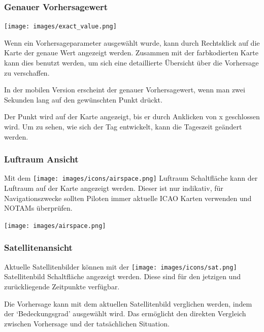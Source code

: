 \documentclass[11pt,a4paper]{article}
\begin{document}
\subsubsection{Genauer Vorhersagewert}
\begin{center}
\texttt{[image: images/exact\_value.png]}
\end{center}

Wenn ein Vorhersageparameter ausgewählt wurde, kann durch Rechtsklick auf die Karte der genaue Wert angezeigt werden. Zusammen mit der farbkodierten Karte kann dies benutzt werden, um sich eine detaillierte Übersicht über die Vorhersage zu verschaffen.

In der mobilen Version erscheint der genauer Vorhersagewert, wenn man zwei Sekunden lang auf den gewünschten Punkt drückt.

\begin{tip}
\item Der Punkt wird auf der Karte angezeigt, bis er durch Anklicken von x geschlossen wird. Um zu sehen, wie sich der Tag entwickelt, kann die Tageszeit geändert werden.
\end{tip}

\subsubsection{Luftraum Ansicht}
Mit dem \texttt{[image: images/icons/airspace.png]} Luftraum Schaltfläche kann der Luftraum auf der Karte angezeigt werden. Dieser ist nur indikativ, für Navigationszwecke sollten Piloten immer aktuelle ICAO Karten verwenden und NOTAMs überprüfen.
\begin{center}
\texttt{[image: images/airspace.png]}
\end{center}

\subsubsection{Satellitenansicht} \label{subsec:satview}
Aktuelle Satellitenbilder können mit der \texttt{[image: images/icons/sat.png]} Satellitenbild Schaltfläche angezeigt werden. Diese sind für den jetzigen und zurückliegende Zeitpunkte verfügbar.

\begin{tip}
\item Die Vorhersage kann mit dem aktuellen Satellitenbild verglichen werden, indem der `Bedeckungsgrad' ausgewählt wird. Das ermöglicht den direkten Vergleich zwischen Vorhersage und der tatsächlichen Situation.\end{tip}
\end{document}
